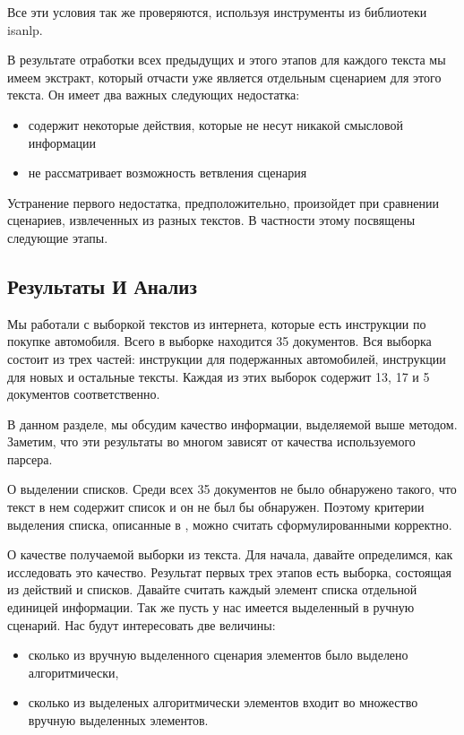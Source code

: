 \documentclass[12pt]{article}
\begin{document}
Все эти условия так же проверяются, используя инструменты из библиотеки isanlp.

В результате отработки всех предыдущих и этого этапов для каждого текста мы имеем экстракт, который отчасти уже является отдельным сценарием для этого текста. Он имеет два важных следующих недостатка:
\begin{itemize}
	\item содержит некоторые действия, которые не несут никакой смысловой информации
	\item не рассматривает возможность ветвления сценария
\end{itemize}

Устранение первого недостатка, предположительно, произойдет при сравнении сценариев, извлеченных из разных текстов. В частности этому посвящены следующие этапы.

\subsection{Результаты И Анализ}
\label{marker7}

Мы работали с выборкой текстов из интернета, которые есть инструкции по покупке автомобиля. Всего в выборке находится 35 документов. Вся выборка состоит из трех частей: инструкции для подержанных автомобилей, инструкции для новых и остальные тексты. Каждая из этих выборок содержит 13, 17 и 5 документов соответственно.

В данном разделе, мы обсудим качество информации, выделяемой выше методом. Заметим, что эти результаты во многом зависят от качества используемого парсера.

О выделении списков. Среди всех 35 документов не было обнаружено такого, что текст в нем содержит список и он не был бы обнаружен. Поэтому критерии выделения списка, описанные в , можно считать сформулированными корректно.

О качестве получаемой выборки из текста. Для начала, давайте определимся, как исследовать это качество. Результат первых трех этапов есть выборка, состоящая из действий и списков. Давайте считать каждый элемент списка отдельной единицей информации. Так же пусть у нас имеется выделенный в ручную сценарий. Нас будут интересовать две величины:
\begin{itemize}
	\item сколько из вручную выделенного сценария элементов было выделено алгоритмически,
	\item сколько из выделеных алгоритмически элементов входит во множество вручную выделенных элементов.
\end{itemize}
\end{document}
